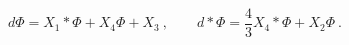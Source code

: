 \begin{equation}
  \label{eq:g2tors}
  d\Phi= X_1 *\Phi + X_4 \Phi + X_3\ , \qquad 
  d*\Phi= \frac43 X_4 *\Phi +X_2 \Phi\ .
\end{equation}

